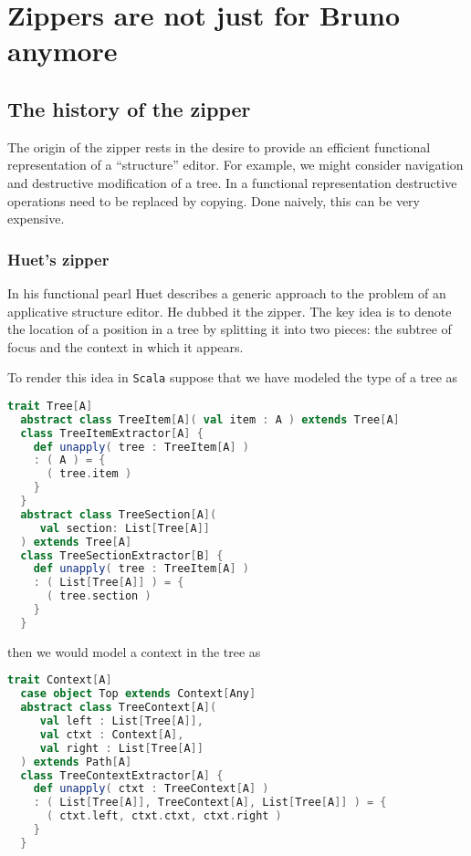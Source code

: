 \section{Zippers are not just for Bruno anymore}

\subsection{The history of the zipper}

The origin of the zipper rests in the desire to provide an efficient
functional representation of a ``structure'' editor. For example, we
might consider navigation and destructive modification of a tree. In a
functional representation destructive operations need to be replaced
by copying. Done naively, this can be very expensive.

\subsubsection{Huet's zipper}

In his functional pearl Huet describes a generic approach to the
problem of an applicative structure editor. He dubbed it the
zipper. The key idea is to denote the location of a position in a tree
by splitting it into two pieces: the subtree of focus and the context
in which it appears.

To render this idea in \texttt{Scala} suppose that we have modeled the
type of a tree as

\begin{lstlisting}[language=Scala,mathescape=true]
  trait Tree[A]
  abstract class TreeItem[A]( val item : A ) extends Tree[A]
  class TreeItemExtractor[A] {
    def unapply( tree : TreeItem[A] )
    : ( A ) = {
      ( tree.item )
    }
  }
  abstract class TreeSection[A](
     val section: List[Tree[A]]
  ) extends Tree[A]
  class TreeSectionExtractor[B] {
    def unapply( tree : TreeItem[A] )
    : ( List[Tree[A]] ) = {
      ( tree.section )
    }
  }
\end{lstlisting}

then we would model a context in the tree as

\begin{lstlisting}[language=Scala,mathescape=true]
  trait Context[A]
  case object Top extends Context[Any]
  abstract class TreeContext[A](
     val left : List[Tree[A]],
     val ctxt : Context[A],
     val right : List[Tree[A]]
  ) extends Path[A]
  class TreeContextExtractor[A] {
    def unapply( ctxt : TreeContext[A] )
    : ( List[Tree[A]], TreeContext[A], List[Tree[A]] ) = {
      ( ctxt.left, ctxt.ctxt, ctxt.right )
    }
  }
\end{lstlisting}


